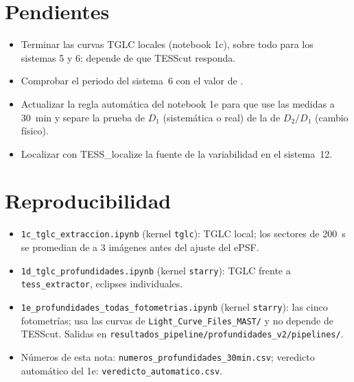 \documentclass[11pt,a4paper]{article}
\newcommand{\tx}{\texttt{tess\_extractor}}
\newcommand{\Dum}{D_2/D_1}
\begin{document}
\section{Pendientes}
\begin{itemize}
\item Terminar las curvas TGLC locales (notebook 1c), sobre todo para los sistemas 5 y 6; depende de que
  TESScut responda.
\item Comprobar el periodo del sistema~6 con el valor de \citet{KounkelStassun2024}.
\item Actualizar la regla automática del notebook 1e para que use las medidas a 30~min y separe la prueba de
  $D_1$ (sistemática o real) de la de $\Dum$ (cambio físico).
\item Localizar con TESS\_localize \citep{HigginsBell2023} la fuente de la variabilidad en el sistema~12.
\end{itemize}

\section{Reproducibilidad}
\begin{itemize}
\item \texttt{1c\_tglc\_extraccion.ipynb} (kernel \texttt{tglc}): TGLC local; los sectores de 200~s se
  promedian de a 3 imágenes antes del ajuste del ePSF.
\item \texttt{1d\_tglc\_profundidades.ipynb} (kernel \texttt{starry}): TGLC frente a \tx, eclipses
  individuales.
\item \texttt{1e\_profundidades\_todas\_fotometrias.ipynb} (kernel \texttt{starry}): las cinco fotometrías;
  usa las curvas de \texttt{Light\_Curve\_Files\_MAST/} y no depende de TESScut. Salidas en
  \texttt{resultados\_pipeline/profundidades\_v2/pipelines/}.
\item Números de esta nota: \texttt{numeros\_profundidades\_30min.csv}; veredicto automático del 1e:
  \texttt{veredicto\_automatico.csv}.
\end{itemize}



\end{document}
